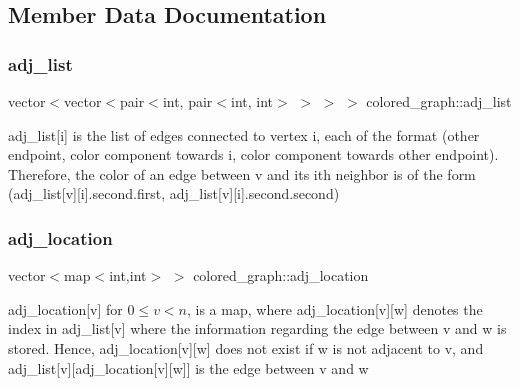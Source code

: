 \subsection{Member Data Documentation}
\mbox{\label{classcolored__graph_a45dce16965079286cf3f41a54a1b2ea4}} 
\subsubsection{\texorpdfstring{adj\+\_\+list}{adj\_list}}
{\footnotesize\ttfamily vector$<$vector$<$pair$<$int, pair$<$int, int$>$ $>$ $>$ $>$ colored\+\_\+graph\+::adj\+\_\+list}



adj\+\_\+list\mbox{[}i\mbox{]} is the list of edges connected to vertex i, each of the format (other endpoint, color component towards i, color component towards other endpoint). Therefore, the color of an edge between v and its ith neighbor is of the form (adj\+\_\+list\mbox{[}v\mbox{]}\mbox{[}i\mbox{]}.second.\+first, adj\+\_\+list\mbox{[}v\mbox{]}\mbox{[}i\mbox{]}.second.\+second) 

\mbox{\label{classcolored__graph_ad657e7e86bee874d19dbc1765e1edaa7}} 
\subsubsection{\texorpdfstring{adj\+\_\+location}{adj\_location}}
{\footnotesize\ttfamily vector$<$map$<$int,int$>$ $>$ colored\+\_\+graph\+::adj\+\_\+location}



adj\+\_\+location\mbox{[}v\mbox{]} for $0 \leq v < n$, is a map, where adj\+\_\+location\mbox{[}v\mbox{]}\mbox{[}w\mbox{]} denotes the index in adj\+\_\+list\mbox{[}v\mbox{]} where the information regarding the edge between v and w is stored. Hence, adj\+\_\+location\mbox{[}v\mbox{]}\mbox{[}w\mbox{]} does not exist if w is not adjacent to v, and adj\+\_\+list\mbox{[}v\mbox{]}\mbox{[}adj\+\_\+location\mbox{[}v\mbox{]}\mbox{[}w\mbox{]}\mbox{]} is the edge between v and w 

\mbox{\label{classcolored__graph_a5b0e93eb40a20dc815c809dee11edc12}} 
